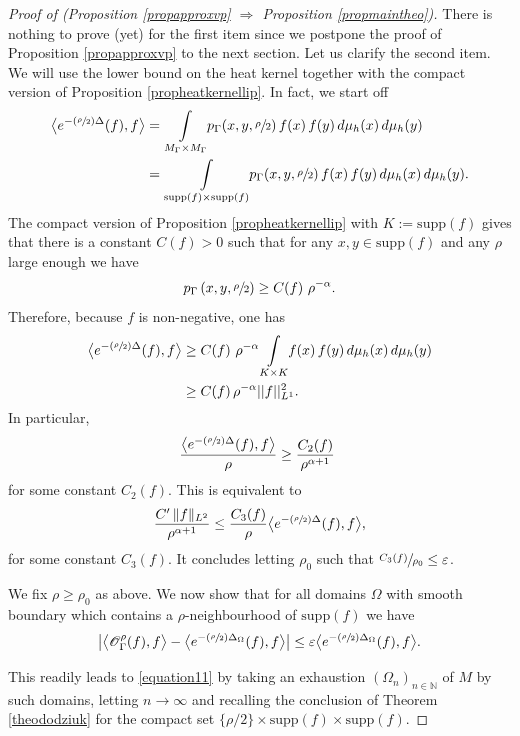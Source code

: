\documentclass[10pt]{amsart}
\let\mathcal\mathscr
\let\epsilon\varepsilon
\newcommand{\Psfrac}[2]{(\sfrac{#1}{#2})}
\theoremstyle{plain}
\theoremstyle{definition}
\newcommand{\NN}{\mathbb{N}}
\newcommand{\inte}[1]{\underset{#1}{\int}}
\newcommand{\supp}[1]{\mathrm{supp}(#1)}
\begin{document}
\begin{proof}[Proof of (Proposition \ref{propapproxvp}
$\Rightarrow$ Proposition \ref{propmaintheo})]
There is nothing to prove (yet) for the first item since we postpone the proof of Proposition \ref{propapproxvp} to the next section. Let us clarify the second item. We will use the lower bound on the heat kernel together with the compact version of Proposition \ref{propheatkernellip}. In fact, we start off
\begin{align*}
\bigl< e^{- \Psfrac{\rho }{2} \Delta}(f), f \bigr> & = \inte{M_{\Gamma} \times M_{\Gamma}} p_{\Gamma}(x,y, \sfrac{\rho}{2}) \, f(x) \, f(y) \,d \mu_h(x) \,d \mu_h(y) \\
& = \inte{\supp{f} \times \supp{f}} p_{\Gamma}(x,y, \sfrac{\rho}{2}) \, f(x) \, f(y) \,d \mu_h(x) \,d \mu_h(y).
\end{align*}
The compact version of Proposition \ref{propheatkernellip} with $K := \supp{f}$ gives that there is a constant $C(f) > 0$ such that for any $x,y \in \supp{f}$ and any $\rho$ large enough we have
\[
p_{\Gamma} \left(x,y, \sfrac{\rho}{2} \right) \ge C(f) \ \rho^{- \alpha}.
\]
Therefore, because $f$ is non-negative, one has
\begin{align*}
\bigl< e^{- \Psfrac{\rho }{2} \Delta}(f), f \bigr> & \ge C(f) \ \rho^{-\alpha} \inte{K \times K} f(x)\, f(y) \,d \mu_h(x) \,d \mu_h(y) \\
& \ge C(f) \, \rho^{-\alpha} || f ||_{L^1}^2.
\end{align*}
In particular,
\[
\frac{ \bigl< e^{- \Psfrac{\rho }{2} \Delta}(f), f \bigr> }{\rho} \ge \frac{C_2(f)}{\rho^{\alpha +1}} \
\]
for some constant $C_2(f)$. This is equivalent to
\[
\frac{C' \, \|f\|_{L^2}}{\rho^{\alpha +1}} \le \frac{ C_3(f)}{\rho} \bigl< e^{- \Psfrac{\rho }{2} \Delta}(f), f \bigr>,
\]
for some constant $C_3(f)$. It concludes letting $\rho_0$ such that
$ \sfrac{ C_3(f)}{\rho_0} \le \epsilon$.

We fix $\rho \ge \rho_0$ as above. We now show that for all domains $\Omega$ with smooth boundary which contains a $\rho$-neighbourhood of $\text{supp}(f)$ we have
\begin{equation}
\label{equation12}
\bigl| \bigl< \mathcal{O}_{\Gamma}^{\rho}(f), f \bigr> - \bigl< e^{- \Psfrac{\rho}{2} \Delta_{\Omega}}(f), f \bigr> \bigr| \le \epsilon \bigl< e^{- \Psfrac{\rho}{2} \Delta_{\Omega}}(f), f \bigr>.
\end{equation}

This readily leads to \eqref{equation11} by taking an exhaustion $(\Omega_n)_{n \in \NN}$ of $M$ by such domains, letting $n \to \infty$ and recalling the conclusion of Theorem \ref{theododziuk} for the compact set $\{ \rho/2 \} \times \text{supp}(f) \times \text{supp}(f)$.


\end{proof}
\end{document}
